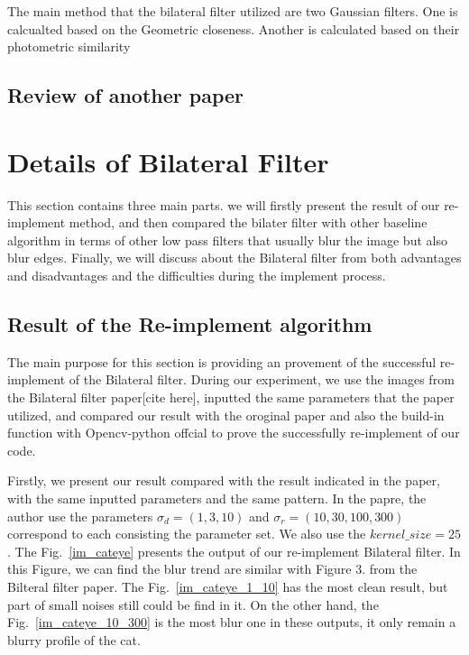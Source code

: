 \documentclass[12pt]{article}
\begin{document}
The main method that the bilateral filter utilized are two Gaussian filters. 
One is calcualted based on the Geometric closeness. 
Another is calculated based on their photometric similarity



\subsection{Review of another paper}


\section{Details of Bilateral Filter}
\label{section Bilateral_filter}
This section contains three main parts. we will firstly present the result of our re-implement method, and then compared the bilater filter with other baseline algorithm in terms of other low pass filters that usually blur the image but also blur edges. 
Finally, we will discuss about the Bilateral filter from both advantages and disadvantages and the difficulties during the implement process.


\subsection{Result of the Re-implement algorithm}
\label{section reimplement}
The main purpose for this section is providing an provement of the successful re-implement of the Bilateral filter.
During our experiment, we use the images from the Bilateral filter paper[cite here], inputted the same parameters that the paper utilized, and compared our result with the oroginal paper and also the build-in function with Opencv-python offcial to prove the successfully re-implement of our code.

Firstly, we present our result compared with the result indicated in the paper, with the same inputted parameters and the same pattern.
In the papre, the author use the parameters $\sigma_d = (1, 3, 10)$ and $\sigma_r = (10, 30, 100, 300)$ correspond to each consisting the parameter set.  
We also use the $kernel\_size = 25$.
The Fig.~\ref{im_cateye} presents the output of our re-implement Bilateral filter.
In this Figure, we can find the blur trend are similar with Figure 3. from the Bilteral filter paper.
The Fig.~\ref{im_cateye_1_10} has the most clean result, but part of small noises still could be find in it. 
On the other hand, the Fig.~\ref{im_cateye_10_300} is the most blur one in these outputs, it only remain a blurry profile of the cat. 
\end{document}
